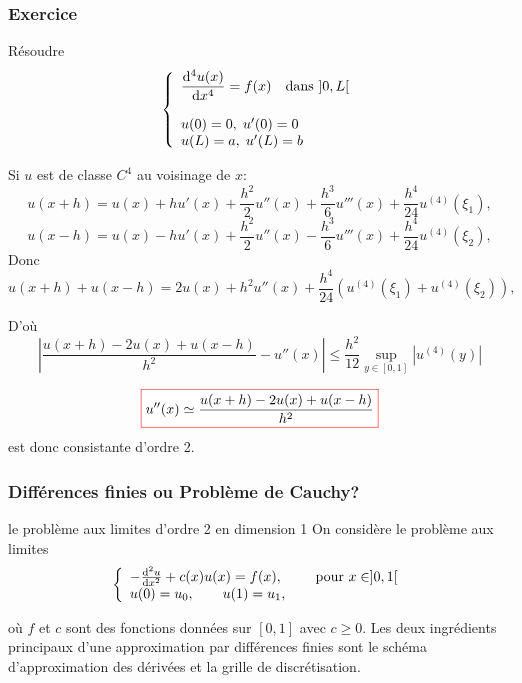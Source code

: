 \documentclass{beamer}
\def \de {{\rm d}}
\newcommand{\myredbox}[1]{\fcolorbox{red}{white}{$\displaystyle#1$}}
\begin{document}
\begin{frame}
\frametitle{Exercice}
Résoudre
\[\left\{\begin{array}{l}
\displaystyle \frac{\de ^4 u(x)}{\de x^4} =f(x)\quad\mbox{dans }]0,L[\\
\\
u(0)=0,\;u'(0)=0\\
 u(L)=a,\;u'(L)=b
\end{array}\right.\]
\end{frame}
\begin{frame}
Si $u$ est de classe $C^4$ au voisinage de $x$:
\[u(x+h)=u(x)+h u'(x)+\frac{h^2}2 u''(x)+\frac{h^3}6 u'''(x)+\frac{h^4}{24} u^{(4)}(\xi_1) ,\]
\[u(x-h)=u(x)-h u'(x)+\frac{h^2}2 u''(x)-\frac{h^3}6 u'''(x)+\frac{h^4}{24} u^{(4)}(\xi_2) ,\]
Donc
\[u(x+h)+u(x-h)=2u(x)+h^2 u''(x)+\frac{h^4}{24} \left(u^{(4)}(\xi_1) + u^{(4)}(\xi_2)\right) ,\]




D'où
\[\left| \frac{u(x+h)-2u(x)+u(x-h)}{h^2}- u''(x) \right|\leq \frac{h^2}{12}\sup_{y\in[0,1]} |u^{(4)}(y)| \]


 \[\myredbox{u''(x)\simeq \frac{u(x+h)-2u(x)+u(x-h)}{h^2}}\] 
 est donc consistante d'ordre 2. 
\end{frame}
 
 \begin{frame}
\frametitle{Différences finies ou Problème de Cauchy?}
le problème aux limites d'ordre 2 en dimension 1
On considère le problème aux limites
\begin{equation}
\left\{\begin{array}{l}
-\frac{\de^2 u}{\de x^2}+c(x) u(x) =f(x), \qquad \mbox{ pour }x\in ]0,1[ \\
u(0)=u_0,\qquad u(1)=u_1,
\end{array}\right.
\end{equation}
 
où $f$ et $c$ sont des fonctions données sur $[0, 1]$ avec $c \geqslant 0$.
Les deux ingrédients principaux d'une approximation par différences finies sont le schéma d'approximation des dérivées et la grille de discrétisation.
 \end{frame}
 
\end{document}
